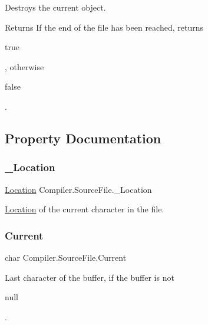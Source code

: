 Destroys the current object. \begin{DoxyReturn}{Returns}
If the end of the file has been reached, returns
\begin{DoxyCode}
\textcolor{keyword}{true} 
\end{DoxyCode}
 , otherwise
\begin{DoxyCode}
\textcolor{keyword}{false} 
\end{DoxyCode}
 . 
\end{DoxyReturn}


\subsection{Property Documentation}
\mbox{\label{class_compiler_1_1_source_file_a9f6feacf9e20b5b1d535c712d9b4370e}} 
\subsubsection{\texorpdfstring{\+\_\+\+Location}{\_Location}}
{\footnotesize\ttfamily \mbox{\hyperlink{class_compiler_1_1_location}{Location}} Compiler.\+Source\+File.\+\_\+\+Location\hspace{0.3cm}{\ttfamily [get]}}

\mbox{\hyperlink{class_compiler_1_1_location}{Location}} of the current character in the file. \mbox{\label{class_compiler_1_1_source_file_a2d009621871245dfb64d3866ece03633}} 
\subsubsection{\texorpdfstring{Current}{Current}}
{\footnotesize\ttfamily char Compiler.\+Source\+File.\+Current\hspace{0.3cm}{\ttfamily [get]}}

Last character of the buffer, if the buffer is not
\begin{DoxyCode}
null 
\end{DoxyCode}
 . \mbox{\label{class_compiler_1_1_source_file_a0e304ca0e3d5b0af3dd18d09520f215e}} 
